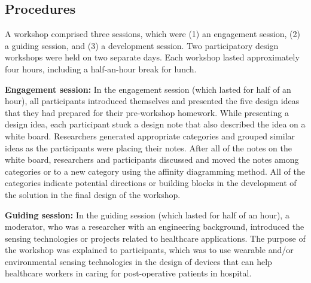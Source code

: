 \subsection{Procedures}
A workshop comprised three sessions, which were (1) an engagement session, (2) a guiding session, and (3) a development session. Two participatory design workshops were held on two separate days. Each workshop lasted approximately four hours, including a half-an-hour break for lunch. \vspace{10pt}

\textbf{Engagement session:} 
\newline
In the engagement session (which lasted for half of an hour), all participants introduced themselves and presented the five design ideas that they had prepared for their pre-workshop homework. While presenting a design idea, each participant stuck a design note that also described the idea on a white board. Researchers generated appropriate categories and grouped similar ideas as the participants were placing their notes. After all of the notes on the white board, researchers and participants discussed and moved the notes among categories or to a new category using the affinity diagramming method. All of the categories indicate potential directions or building blocks in the development of the solution in the final design of the workshop. 

\textbf{Guiding session:} 
\newline
In the guiding session (which lasted for half of an hour), a moderator, who was a researcher with an engineering background, introduced the sensing technologies or projects related to healthcare applications. The purpose of the workshop was explained to participants, which was to use wearable and/or environmental sensing technologies in the design of devices that can help healthcare workers in caring for post-operative patients in hospital. 

